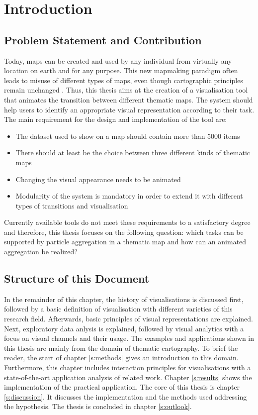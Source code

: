 \section{Introduction}


\subsection{Problem Statement and Contribution}
Today, maps can be created and used by any individual from virtually any location on earth and for any purpose. This new mapmaking paradigm often leads to misuse of different types of maps, even though cartographic principles remain unchanged .
Thus, this thesis aims at the creation of a visualisation tool that animates the transition between different thematic maps. The system should help users to identify an appropriate visual representation according to their task. The main requirement for the design and implementation of the tool are:
\begin{itemize}
\item The dataset used to show on a map should contain more than 5000 items
\item There should at least be the choice between three different kinds of thematic maps
\item Changing the visual appearance needs to be animated
\item Modularity of the system is mandatory in order to extend it with different types of transitions and visualisation
\end{itemize}
Currently available tools do not meet these requirements to a satisfactory degree and therefore, this thesis focuses on the following question:
which tasks can be supported by particle aggregation in a thematic map and how can an animated aggregation be realized?

\subsection{Structure of this Document}
In the remainder of this chapter, the history of visualisations is discussed first, followed by a basic definition of visualisation with different varieties of this research field. Afterwards, basic principles of visual representations are explained. Next, exploratory data anlysis is explained, followed by visual analytics with a focus on visual channels and their usage.
The examples and applications shown in this thesis are mainly from the domain of thematic cartography. To brief the reader, the start of chapter \ref{s:methods} gives an introduction to this domain. Furthermore, this chapter includes interaction principles for visualisations with a state-of-the-art application analysis of related work. Chapter \ref{s:results} shows the implementation of the practical application. The core of this thesis is chapter \ref{s:discussion}. It discusses the implementation and the methods used addressing the hypothesis. The thesis is concluded in chapter \ref{s:outlook}.

